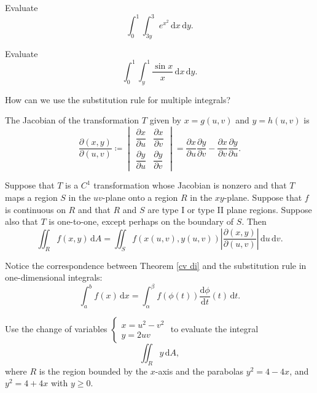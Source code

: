 \documentclass[11pt]{article}
\theoremstyle{break}
\theoremstyle{no_label}
\newcommand{\derivative}[2]{\dfrac{\dd{#1}}{\dd{#2}}}
\newcommand{\pderivative}[2]{\dfrac{\partial {#1}}{\partial {#2}}}
\newcommand{\dd}{\text{d}}
\newcommand{\ddi}{\text{$\,$d}}
\numberwithin{equation}{theorem}
\begin{document}
\begin{example}
    Evaluate $$\int_{0}^{1}\int_{3y}^{3}e^{x^2}\ddi x\ddi y.$$
\end{example}
\newpage

\begin{example}
    Evaluate $$\int_{0}^{1}\int_{y}^{1}\dfrac{\sin x}{x}\ddi x\ddi y.$$
\end{example}
\newpage

\begin{question}
    How can we use the substitution rule for multiple integrals?
\end{question}

\begin{definition}
    The Jacobian of the transformation $T$ given by $x=g(u, v)$ and $y=h(u, v)$ is $$\dfrac{\partial(x, y)}{\partial(u, v)}\coloneq\begin{vmatrix}
        \pderivative{x}{u} & \pderivative{x}{v} \\ \pderivative{y}{u} & \pderivative{y}{v}
    \end{vmatrix}=\pderivative{x}{u}\pderivative{y}{v}-\pderivative{x}{v}\pderivative{y}{u}.$$
\end{definition}

\begin{theorem}\label{cv di}
    Suppose that $T$ is a $C^1$ transformation whose Jacobian is nonzero and that $T$ maps a region $S$ in the $uv$-plane onto a region $R$ in the $xy$-plane. Suppose that $f$ is continuous on $R$ and that $R$ and $S$ are type I or type II plane regions. Suppose also that $T$ is one-to-one, except perhaps on the boundary of $S$. Then $$\iint_R f(x, y)\ddi A=\iint_S f(x(u,v), y(u, v))\left|\dfrac{\partial(x, y)}{\partial(u, v)}\right|\ddi u\ddi v.$$
\end{theorem}

\begin{remark}
    Notice the correspondence between Theorem \ref*{cv di} and the substitution rule in one-dimensional integrals: $$\int_a^b f(x)\ddi x=\int_{\alpha}^{\beta}f(\phi(t))\derivative{\phi}{t}(t)\ddi t.$$
\end{remark}
\newpage

\begin{example}
    Use the change of variables $\left\{\begin{array}{l}
        x=u^2-v^2\\
        y=2uv
    \end{array}\right.$ to evaluate the integral $$\iint_R y\ddi A,$$ where $R$ is the region bounded by the $x$-axis and the parabolas $y^2=4-4x$, and $y^2=4+4x$ with $y\geq 0$.
\end{example}
\newpage
\end{document}
